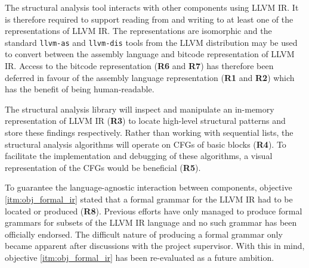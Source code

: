 The structural analysis tool interacts with other components using LLVM IR. It is therefore required to support reading from and writing to at least one of the representations of LLVM IR. The representations are isomorphic and the standard \texttt{llvm-as} and \texttt{llvm-dis} tools from the LLVM distribution may be used to convert between the assembly language and bitcode representation of LLVM IR. Access to the bitcode representation (\textbf{R6} and \textbf{R7}) has therefore been deferred in favour of the assembly language representation (\textbf{R1} and \textbf{R2}) which has the benefit of being human-readable.

The structural analysis library will inspect and manipulate an in-memory representation of LLVM IR (\textbf{R3}) to locate high-level structural patterns and store these findings respectively. Rather than working with sequential lists, the structural analysis algorithms will operate on CFGs of basic blocks (\textbf{R4}). To facilitate the implementation and debugging of these algorithms, a visual representation of the CFGs would be beneficial (\textbf{R5}).

To guarantee the language-agnostic interaction between components, objective \ref{itm:obj_formal_ir} stated that a formal grammar for the LLVM IR had to be located or produced (\textbf{R8}). Previous efforts have only managed to produce formal grammars for subsets of the LLVM IR language \cite{formal_llvm_ir_spec,formalizing_llvm_ir} and no such grammar has been officially endorsed. The difficult nature of producing a formal grammar only became apparent after discussions with the project supervisor. With this in mind, objective \ref{itm:obj_formal_ir} has been re-evaluated as a future ambition.

